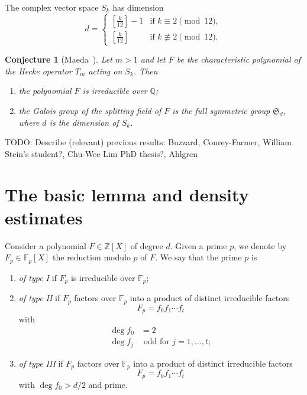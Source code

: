 \documentclass[11pt]{article}
\theoremstyle{plain}
\newtheorem{conjecture}[theorem]{Conjecture}
\theoremstyle{definition}
\theoremstyle{remark}
\numberwithin{equation}{section}
\numberwithin{table}{section}
\newcommand{\ZZ}{\mathbb{Z}}
\newcommand{\FF}{\mathbb{F}}
\newcommand{\QQ}{\mathbb{Q}}
\renewcommand{\SS}{\mathfrak{S}}
\begin{document}
The complex vector space $S_k$ has dimension 
\begin{equation*}
  d=\begin{cases}
    \left[\frac{k}{12}\right]-1 & \text{if }k\equiv 2\pmod{12},\\
    \left[\frac{k}{12}\right] & \text{if }k\not\equiv 2\pmod{12}.
  \end{cases}
\end{equation*}

\begin{conjecture}[Maeda~\cite{Maeda}]
  Let $m>1$ and 
  let $F$ be the characteristic polynomial of the Hecke operator $T_m$ acting
  on $S_k$.  Then 
  \begin{enumerate}
    \item the polynomial $F$ is irreducible over $\QQ$;
    \item the Galois group of the splitting field of $F$ is the full symmetric
      group $\SS_d$, where $d$ is the dimension of $S_k$.
  \end{enumerate}
\end{conjecture}

TODO: Describe (relevant) previous results:
Buzzard,
Conrey-Farmer,
William Stein's student?,
Chu-Wee Lim PhD thesis?,
Ahlgren


\section{The basic lemma and density estimates}

Consider a polynomial $F\in\ZZ[X]$ of degree $d$.
Given a prime $p$, we denote by
$F_p\in\FF_p[X]$ the reduction modulo $p$ of $F$.  We say that the prime
$p$ is
\begin{enumerate}
  \item \emph{of type I} if $F_p$ is irreducible over $\FF_p$;
  \item \emph{of type II} if $F_p$ factors over $\FF_p$ into a product of
    distinct irreducible factors
    \begin{equation*}
      F_p=f_0f_1\cdots f_t
    \end{equation*}
    with
    \begin{align*}
      \deg f_0 &= 2\\
      \deg f_j &\text{ odd for }j=1,\ldots,t;
    \end{align*}
  \item \emph{of type III} if $F_p$ factors over $\FF_p$ into a product of
    distinct irreducible factors
    \begin{equation*}
      F_p=f_0f_1\cdots f_t
    \end{equation*}
    with $\deg f_0>d/2$ and prime.
\end{enumerate}
\end{document}
